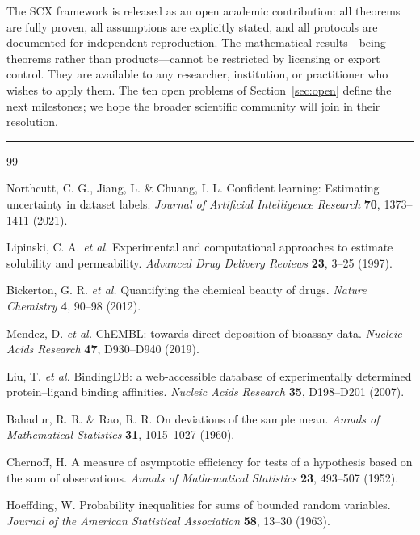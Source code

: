 \documentclass[twocolumn]{article}
\theoremstyle{definition}
\begin{document}
The SCX framework is released as an open academic contribution: all theorems are fully proven, all assumptions are explicitly stated, and all protocols are documented for independent reproduction. The mathematical results---being theorems rather than products---cannot be restricted by licensing or export control. They are available to any researcher, institution, or practitioner who wishes to apply them. The ten open problems of Section~\ref{sec:open} define the next milestones; we hope the broader scientific community will join in their resolution.

\begin{center}
\rule{0.5\textwidth}{0.5pt}
\end{center}

\begin{thebibliography}{99}

Northcutt, C. G., Jiang, L. \& Chuang, I. L. Confident learning: Estimating uncertainty in dataset labels. \emph{Journal of Artificial Intelligence Research} \textbf{70}, 1373--1411 (2021).

Lipinski, C. A. \emph{et al.} Experimental and computational approaches to estimate solubility and permeability. \emph{Advanced Drug Delivery Reviews} \textbf{23}, 3--25 (1997).

Bickerton, G. R. \emph{et al.} Quantifying the chemical beauty of drugs. \emph{Nature Chemistry} \textbf{4}, 90--98 (2012).

Mendez, D. \emph{et al.} ChEMBL: towards direct deposition of bioassay data. \emph{Nucleic Acids Research} \textbf{47}, D930--D940 (2019).

Liu, T. \emph{et al.} BindingDB: a web-accessible database of experimentally determined protein--ligand binding affinities. \emph{Nucleic Acids Research} \textbf{35}, D198--D201 (2007).

Bahadur, R. R. \& Rao, R. R. On deviations of the sample mean. \emph{Annals of Mathematical Statistics} \textbf{31}, 1015--1027 (1960).

Chernoff, H. A measure of asymptotic efficiency for tests of a hypothesis based on the sum of observations. \emph{Annals of Mathematical Statistics} \textbf{23}, 493--507 (1952).

Hoeffding, W. Probability inequalities for sums of bounded random variables. \emph{Journal of the American Statistical Association} \textbf{58}, 13--30 (1963).


\end{thebibliography}
\end{document}
